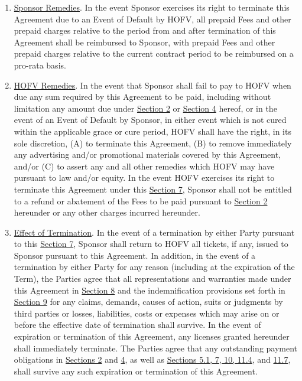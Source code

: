\documentclass[]{article}
\begin{document}
\begin{enumerate}
  \begin{enumerate}
  \def\labelenumii{\alph{enumii}.}
  \item
    \uline{Sponsor Remedies}. In the event Sponsor exercises its right
    to terminate this Agreement due to an Event of Default by HOFV, all
    prepaid Fees and other prepaid charges relative to the period from
    and after termination of this Agreement shall be reimbursed to
    Sponsor, with prepaid Fees and other prepaid charges relative to the
    current contract period to be reimbursed on a pro-rata basis.
  \item
    \uline{HOFV Remedies}. In the event that Sponsor shall fail to pay
    to HOFV when due any sum required by this Agreement to be paid,
    including without limitation any amount due under \uline{Section 2}
    or \uline{Section 4} hereof, or in the event of an Event of Default
    by Sponsor, in either event which is not cured within the applicable
    grace or cure period, HOFV shall have the right, in its sole
    discretion, (A) to terminate this Agreement, (B) to remove
    immediately any advertising and/or promotional materials covered by
    this Agreement, and/or (C) to assert any and all other remedies
    which HOFV may have pursuant to law and/or equity. In the event HOFV
    exercises its right to terminate this Agreement under this
    \uline{Section 7}, Sponsor shall not be entitled to a refund or
    abatement of the Fees to be paid pursuant to \uline{Section 2}
    hereunder or any other charges incurred hereunder.
  \item
    \uline{Effect of Termination}. In the event of a termination by
    either Party pursuant to this \uline{Section 7}, Sponsor shall
    return to HOFV all tickets, if any, issued to Sponsor pursuant to
    this Agreement. In addition, in the event of a termination by either
    Party for any reason (including at the expiration of the Term), the
    Parties agree that all representations and warranties made under
    this Agreement in \uline{Section 8} and the indemnification
    provisions set forth in \uline{Section 9} for any claims, demands,
    causes of action, suits or judgments by third parties or losses,
    liabilities, costs or expenses which may arise on or before the
    effective date of termination shall survive. In the event of
    expiration or termination of this Agreement, any licenses granted
    hereunder shall immediately terminate. The Parties agree that any
    outstanding payment obligations in \uline{Sections 2} and \uline{4},
    as well as \uline{Sections 5.1, 7, 10, 11.4}, and \uline{11.7},
    shall survive any such expiration or termination of this Agreement.
  \end{enumerate}
\end{enumerate}
\end{document}
